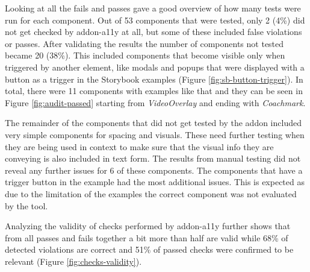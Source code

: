 \documentclass{master_thesis}
\begin{document}
Looking at all the fails and passes gave a good overview of how many tests were run for each component. Out of 53 components that were tested, only 2 (4\%) did not get checked by addon-a11y at all, but some of these included false violations or passes. After validating the results the number of components not tested became 20 (38\%). This included components that become visible only when triggered by another element, like modals and popups that were displayed with a button as a trigger in the Storybook examples (Figure \ref{fig:sb-button-trigger}). In total, there were 11 components with examples like that and they can be seen in Figure \ref{fig:audit-passed} starting from \textit{VideoOverlay} and ending with \textit{Coachmark}.

The remainder of the components that did not get tested by the addon included very simple components for spacing and visuals. These need further testing when they are being used in context to make sure that the visual info they are conveying is also included in text form. The results from manual testing did not reveal any further issues for 6 of these components. The components that have a trigger button in the example had the most additional issues. This is expected as due to the limitation of the examples the correct component was not evaluated by the tool.

Analyzing the validity of checks performed by addon-a11y further shows that from all passes and fails together a bit more than half are valid while 68\% of detected violations are correct and 51\% of passed checks were confirmed to be relevant (Figure \ref{fig:checks-validity}).
\end{document}
